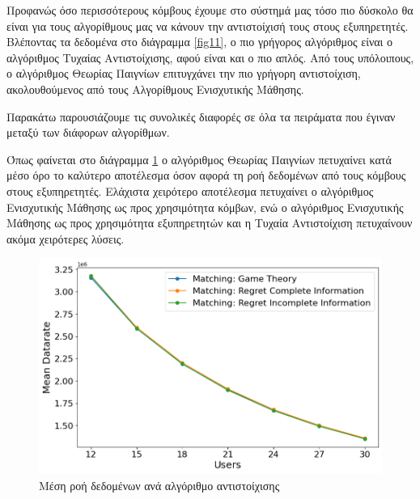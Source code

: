 Προφανώς όσο περισσότερους κόμβους έχουμε στο σύστημά μας τόσο πιο δύσκολο θα είναι για τους αλγορίθμους μας να κάνουν την αντιστοίχισή τους στους εξυπηρετητές. Βλέποντας τα δεδομένα στο διάγραμμα \ref{fig11}, ο πιο γρήγορος αλγόριθμος είναι ο αλγόριθμος Τυχαίας Αντιστοίχισης, αφού είναι και ο πιο απλός. Από τους υπόλοιπους, ο αλγόριθμος Θεωρίας Παιγνίων επιτυγχάνει την πιο γρήγορη αντιστοίχιση, ακολουθούμενος από τους Αλγορίθμους Ενισχυτικής Μάθησης.

Παρακάτω παρουσιάζουμε τις συνολικές διαφορές σε όλα τα πειράματα που έγιναν μεταξύ των διάφορων αλγορίθμων.

Όπως φαίνεται στο διάγραμμα \ref*{fig12} ο αλγόριθμος Θεωρίας Παιγνίων πετυχαίνει κατά μέσο όρο το καλύτερο αποτέλεσμα όσον αφορά τη ροή δεδομένων από τους κόμβους στους εξυπηρετητές. Ελάχιστα χειρότερο αποτέλεσμα πετυχαίνει ο αλγόριθμος Ενισχυτικής Μάθησης ως προς χρησιμότητα κόμβων, ενώ ο αλγόριθμος Ενισχυτικής Μάθησης ως προς χρησιμότητα εξυπηρετητών και η Τυχαία Αντιστοίχιση πετυχαίνουν ακόμα χειρότερες λύσεις.

\newpage

\begin{figure}[H]
    \centering
    \includegraphics[width=\textwidth]{figures/chapter4/Mean_Datarate_vs_Users.png}
    \caption{Μέση ροή δεδομένων ανά αλγόριθμο αντιστοίχισης}
    \label{fig12}
\end{figure}

